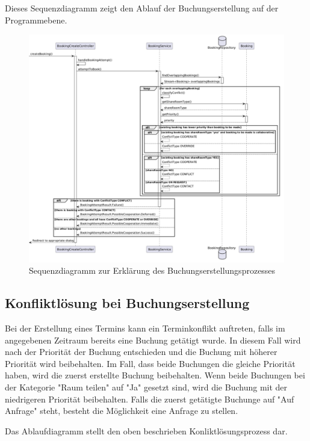 Dieses Sequenzdiagramm zeigt den Ablauf der Buchungserstellung auf der Programmebene.

\begin{figure}[ht]
    \centering
    \includegraphics[width=\textwidth]{figures/activity/SequenzdiagrammBuchungErstellen}
    \caption{Sequenzdiagramm zur Erklärung des Buchungserstellungsprozesses}
    \label{fig:make-booking-sequence-diagram}
\end{figure}

\subsection{Konfliktlösung bei Buchungserstellung}

Bei der Erstellung eines Termins kann ein Terminkonflikt auftreten, falls im angegebenen Zeitraum bereits eine
Buchung getätigt wurde. In diesem Fall wird nach der Priorität der Buchung entschieden und die Buchung mit
höherer Priorität wird beibehalten. Im Fall, dass beide Buchungen die gleiche Priorität haben, wird die zuerst
erstellte Buchung beibehalten. Wenn beide Buchungen bei der Kategorie "Raum teilen" auf "Ja" gesetzt sind, wird die
Buchung mit der niedrigeren Priorität beibehalten. Falls die zuerst getätigte Buchunge auf "Auf Anfrage" steht,
besteht die Möglichkeit eine Anfrage zu stellen.

Das Ablaufdiagramm stellt den oben beschrieben Konliktlösungsprozess dar.

